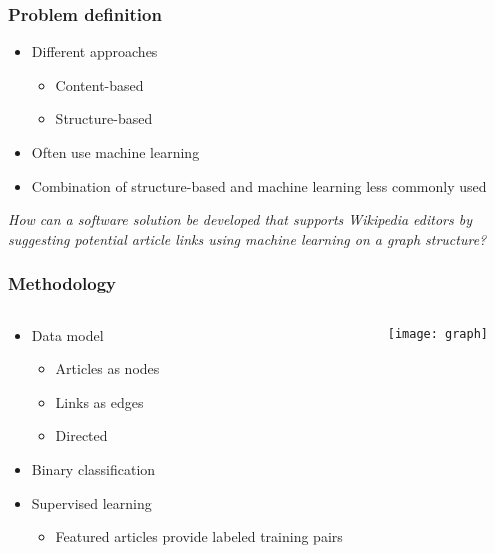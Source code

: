 \begin{frame}
    \frametitle{Problem definition}
    \centering
    \begin{itemize}
      \item Different approaches
        \begin{itemize}
          \item Content-based
          \item Structure-based
        \end{itemize}
      \item Often use machine learning
      \item Combination of structure-based and machine learning less commonly used
    \end{itemize}
    \emph{How can a software solution be developed that supports Wikipedia editors by suggesting potential article links using machine learning on a graph structure?}
\end{frame}
\note{
}

\begin{frame}
    \frametitle{Methodology}
    \begin{columns}[T]
      \begin{column}{0.55\textwidth}
        \begin{itemize}
          \item Data model
            \begin{itemize}
              \item Articles as nodes
              \item Links as edges
              \item Directed
            \end{itemize}
          \item Binary classification
          \item Supervised learning
            \begin{itemize}
              \item Featured articles provide labeled training pairs
            \end{itemize}
        \end{itemize}
      \end{column}
      \begin{column}{0.45\textwidth}
        \texttt{[image: graph]}
      \end{column}
    \end{columns}

\end{frame}

